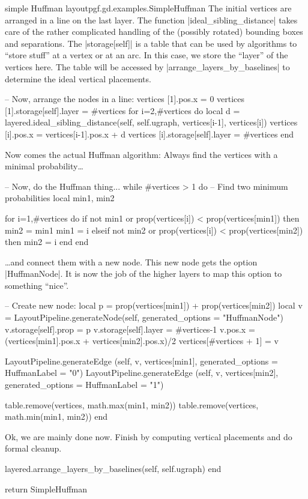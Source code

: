 \begin{gdalgorithm}{simple Huffman layout}{pgf.gd.examples.SimpleHuffman}
  The initial vertices are arranged in a line on the last layer. The
  function |ideal_sibling_distance| takes care of the rather
  complicated handling of the (possibly rotated) bounding boxes and
  separations. The |storage[self]| is a table that can be used by
  algorithms to ``store stuff'' at a vertex or at an arc. In this
  case, we store the ``layer'' of the vertices here. The table will be
  accessed by |arrange_layers_by_baselines| to determine the ideal
  vertical placements.
\begin{codeexample}
  -- Now, arrange the nodes in a line:
  vertices [1].pos.x = 0
  vertices [1].storage[self].layer = #vertices
  for i=2,#vertices do
    local d = layered.ideal_sibling_distance(self, self.ugraph, vertices[i-1], vertices[i])
    vertices [i].pos.x = vertices[i-1].pos.x + d
    vertices [i].storage[self].layer = #vertices
  end
\end{codeexample}  

  Now comes the actual Huffman algorithm: Always find the vertices
  with a minimal probability\dots
\begin{codeexample}
  -- Now, do the Huffman thing...
  while #vertices > 1 do
    -- Find two minimum probabilities
    local min1, min2

    for i=1,#vertices do
      if not min1 or prop(vertices[i]) < prop(vertices[min1]) then
        min2 = min1
        min1 = i
      elseif not min2 or prop(vertices[i]) < prop(vertices[min2]) then
        min2 = i
      end
    end
\end{codeexample}
  \dots and connect them with a new node. This new node gets the
  option |HuffmanNode|. It is now the job of the higher layers to map
  this option to something ``nice''.
\begin{codeexample}
  -- Create new node:
    local p = prop(vertices[min1]) + prop(vertices[min2])
    local v = LayoutPipeline.generateNode(self, { generated_options = {"HuffmanNode"}})
    v.storage[self].prop = p
    v.storage[self].layer = #vertices-1
    v.pos.x = (vertices[min1].pos.x + vertices[min2].pos.x)/2
    vertices[#vertices + 1] = v
    
    LayoutPipeline.generateEdge (self, v, vertices[min1],
                                 {generated_options = {HuffmanLabel = "0"}})
    LayoutPipeline.generateEdge (self, v, vertices[min2],
                                 {generated_options = {HuffmanLabel = "1"}})

    table.remove(vertices, math.max(min1, min2))
    table.remove(vertices, math.min(min1, min2))
  end
\end{codeexample}
  Ok, we are mainly done now. Finish by computing vertical placements
  and do formal cleanup.
\begin{codeexample}
  layered.arrange_layers_by_baselines(self, self.ugraph)
end

return SimpleHuffman
\end{codeexample}
\end{gdalgorithm}




